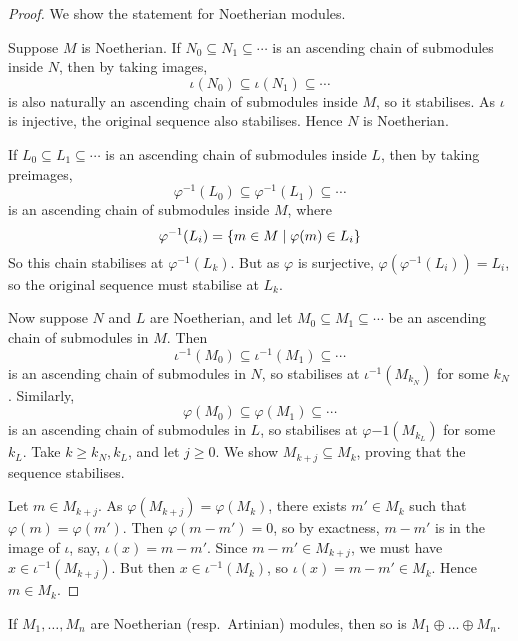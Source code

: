 \begin{proof}
    We show the statement for Noetherian modules.

    Suppose \( M \) is Noetherian.
    If \( N_0 \subseteq N_1 \subseteq \cdots \) is an ascending chain of submodules inside \( N \), then by taking images,
    \[ \iota(N_0) \subseteq \iota(N_1) \subseteq \cdots \]
    is also naturally an ascending chain of submodules inside \( M \), so it stabilises.
    As \( \iota \) is injective, the original sequence also stabilises.
    Hence \( N \) is Noetherian.

    If \( L_0 \subseteq L_1 \subseteq \cdots \) is an ascending chain of submodules inside \( L \), then by taking preimages,
    \[ \varphi^{-1}(L_0) \subseteq \varphi^{-1}(L_1) \subseteq \cdots \]
    is an ascending chain of submodules inside \( M \), where
    \[ \varphi^{-1}(L_i) = \qty{m \in M \mid \varphi(m) \in L_i} \]
    So this chain stabilises at \( \varphi^{-1}(L_k) \).
    But as \( \varphi \) is surjective, \( \varphi(\varphi^{-1}(L_i)) = L_i \), so the original sequence must stabilise at \( L_k \).

    Now suppose \( N \) and \( L \) are Noetherian, and let \( M_0 \subseteq M_1 \subseteq \cdots \) be an ascending chain of submodules in \( M \).
    Then
    \[ \iota^{-1}(M_0) \subseteq \iota^{-1}(M_1) \subseteq \cdots \]
    is an ascending chain of submodules in \( N \), so stabilises at \( \iota^{-1}(M_{k_N}) \) for some \( k_N \).
    Similarly,
    \[ \varphi(M_0) \subseteq \varphi(M_1) \subseteq \cdots \]
    is an ascending chain of submodules in \( L \), so stabilises at \( \varphi{-1}(M_{k_L}) \) for some \( k_L \).
    Take \( k \geq k_N, k_L \), and let \( j \geq 0 \).
    We show \( M_{k + j} \subseteq M_k \), proving that the sequence stabilises.

    Let \( m \in M_{k+j} \).
    As \( \varphi(M_{k+j}) = \varphi(M_k) \), there exists \( m' \in M_k \) such that \( \varphi(m) = \varphi(m') \).
    Then \( \varphi(m - m') = 0 \), so by exactness, \( m - m' \) is in the image of \( \iota \), say, \( \iota(x) = m - m' \).
    Since \( m - m' \in M_{k+j} \), we must have \( x \in \iota^{-1}(M_{k+j}) \).
    But then \( x \in \iota^{-1}(M_k) \), so \( \iota(x) = m - m' \in M_k \).
    Hence \( m \in M_k \).
\end{proof}
\begin{corollary}
    If \( M_1, \dots, M_n \) are Noetherian (resp.\ Artinian) modules, then so is \( M_1 \oplus \dots \oplus M_n \).
\end{corollary}
